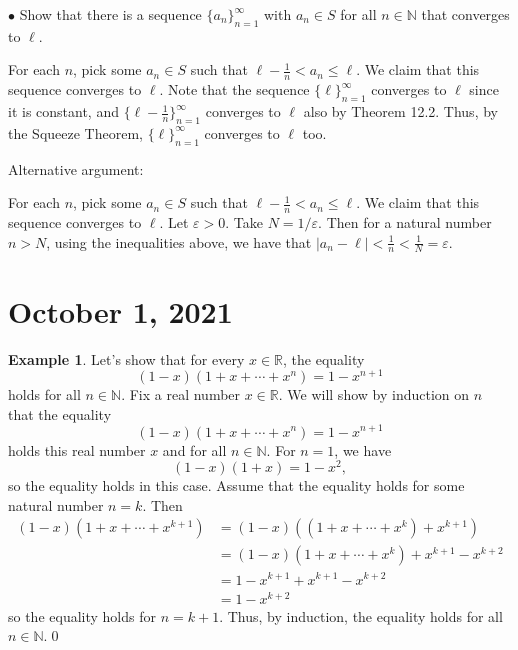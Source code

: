 \documentclass[12pt]{amsart}
\def\e{\varepsilon}
\newcommand{\R}{{\mathbb{R}}}
\newcommand{\N}{\mathbb{N}}
\numberwithin{equation}{section}
\theoremstyle{plain} %
\newcommand{\Oct}[1]{\section{October #1, 2021}}
\theoremstyle{definition}
\newtheorem{ex}[equation]{Example}
\theoremstyle{remark}
\begin{document}
$\bullet$ Show that there is a sequence $\{a_n\}_{n=1}^\infty$ with $a_n\in S$ for all $n\in \N$ that converges to $\ell$.

\begin{framed}
For each $n$, pick some $a_n\in S$ such that $\ell-\frac1n < a_n \leq \ell$. We claim that this sequence converges to $\ell$. Note that the sequence  $\{\ell \}_{n=1}^\infty$ converges to $\ell$ since it is constant, and $\{ \ell-\frac1n \}_{n=1}^\infty$ converges to $\ell$ also by Theorem 12.2. Thus, by the Squeeze Theorem, $\{\ell \}_{n=1}^\infty$ converges to $\ell$ too.


\hrulefill


Alternative argument:


\hrulefill

For each $n$, pick some $a_n\in S$ such that $\ell-\frac1n < a_n \leq \ell$. We claim that this sequence converges to $\ell$. Let $\e>0$. Take $N=1/\e$. Then for a natural number $n>N$, using the inequalities above, we have that $|a_n-\ell|<\frac1n <\frac1N =\e$.

\end{framed}



\Oct{1}





\begin{ex} Let's show that for every $x\in \R$, the equality
\[ (1-x)(1+ x + \cdots + x^n) = 1-x^{n+1}\]
holds for all $n\in \N$.
Fix a real number $x\in \R$. We will show by induction on $n$ that the equality \[ (1-x)(1+ x + \cdots + x^n) = 1-x^{n+1}\]
holds this real number $x$ and for all $n\in \N$. For $n=1$, we have \[(1-x)(1+x) = 1-x^2,\]
so the equality holds in this case. Assume that the equality holds for some natural number $n=k$. Then 
\begin{align*}
(1-x)(1+ x + \cdots + x^{k+1}) &= (1-x)((1+x+\cdots + x^k)+x^{k+1})\\&=(1-x)(1+ x + \cdots + x^k) + x^{k+1} - x^{k+2} \\&= 1-x^{k+1} + x^{k+1} - x^{k+2} \\&= 1-x^{k+2}\end{align*}
so the equality holds for $n=k+1$. Thus, by induction, the equality holds for all $n\in \N$.\qed
\end{ex} 
\end{document}

